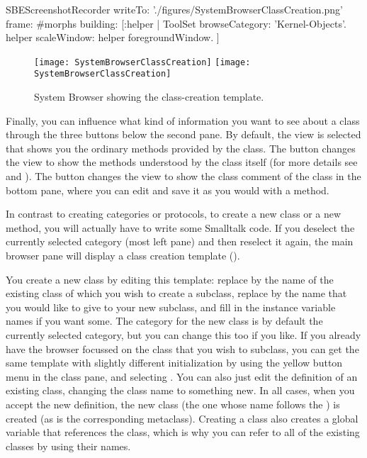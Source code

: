 \documentclass[a4paper,10pt,twoside]{book}
\begin{document}
\begin{ExecuteSmalltalkScript}
SBEScreenshotRecorder writeTo: './figures/SystemBrowserClassCreation.png' frame: #morphs building: [:helper |
	ToolSet browseCategory: 'Kernel-Objects'.
	helper scaleWindow: helper foregroundWindow.
]
\end{ExecuteSmalltalkScript}
\begin{figure}[htbp]
   \centering
   \ifluluelse
	   {\texttt{[image: SystemBrowserClassCreation]}}
	   {\texttt{[image: SystemBrowserClassCreation]}}
   \caption{System Browser showing the class-creation template.
   \label{fig:SystemBrowserClassCreation}}
\end{figure}

Finally, you can influence what kind of information you want to see about a class through the three buttons below the second pane.
By default, the  view is selected that shows you the ordinary methods provided by the class.
The  button changes the view to show the methods understood by the class itself (for more details see  and ).
The  button changes the view to show the class comment of the class in the bottom pane, where you can edit and save it as you would with a method.

In contrast to creating categories or protocols, to create a new class or a new method, you will actually have to write some Smalltalk code.
If you deselect the currently selected category (most left pane) and then reselect it again, the main browser pane will display a class creation template ().

You create a new class by editing this template: replace  by the name of the existing class of which you wish to create a subclass, replace  by the name that you would like to give to your new subclass, and fill in the instance variable names if you want some.
The category for the new class is by default the currently selected category, but you can change this too if you like.
If you already have the browser focussed on the class that you wish to subclass, you can get the same template with slightly different
initialization by using the yellow button menu in the class pane, and selecting .
You can also just edit the definition of an existing class, changing the class name to something new.
In all cases, when you accept the new definition, the new class (the one whose name follows the \ct{#}) is created (as is
the corresponding metaclass).
Creating a class also creates a global variable that references the class, which is why you can refer to all of the existing classes by using their names.
\end{document}

